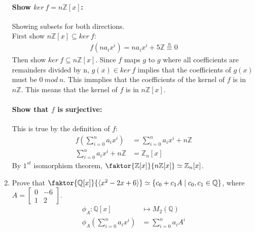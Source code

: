 \documentclass[12pt]{article}
\begin{document}
\begin{enumerate}
		\paragraph{Show $ker\ f = n\mathbb{Z}[x]$:} Showing subsets for both
		directions.\\
		First show $n\mathbb{Z}[x] \subseteq ker\ f$:\\
		\begin{align*}
			f(na_ix^i) =na_ix^i + 5\mathbb{Z} \overset{n}{\equiv} 0
		\end{align*}
		Then show $ker\ f \subseteq n\mathbb{Z}[x]$. Since $f$ maps $g$ to $g$ where
		all coefficients are remainders divided by n, $g(x) \in
		ker\ f$ implies that the coefficients of $g(x)$ must be $0\ mod\ n$. This
		immplies that the coefficients of the kernel of $f$ is in $n\mathbb{Z}$. This
		means that the kernel of $f$ is in $n\mathbb{Z}[x]$.\\
		
		\paragraph{Show that $f$ is surjective:}This is true by the definition of
		$f$:
		\begin{align*}
		f\left(\sum_{i=0}^n a_ix^i\right) &= \sum_{i=0}^n a_ix^i +
		n\mathbb{Z}\\
		\sum_{i=0}^n a_ix^i + n\mathbb{Z} &= \mathbb{Z}_n[x]
		\end{align*}
		By $1^{st}$ isomorphism theorem, $\faktor{\mathbb{Z}[x]}{n\mathbb{Z}[x]} \simeq
		\mathbb{Z}_n[x]$.

	\item Prove that $\faktor{\mathbb{Q}[x]}{\langle x^2-2x+6\rangle} \simeq
		\{c_0 + c_1A \mid c_0, c_1 \in \mathbb{Q}\}$, where $A=\begin{bmatrix}0 &
			-6 \\ 1 & 2\end{bmatrix}$.
		\begin{align*}
			\phi_A:\mathbb{Q}[x] &\mapsto M_2(\mathbb{Q})\\
			\phi_A\left(\sum^n_{i=0}a_ix^i\right) &= \sum^n_{i=0}a_iA^i
		\end{align*}


\end{enumerate}
\end{document}
